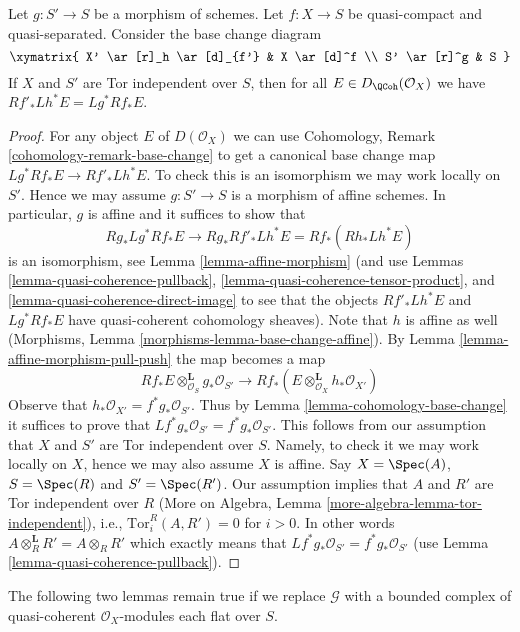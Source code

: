 \begin{lemma}
\label{lemma-compare-base-change}
Let $g : S' \to S$ be a morphism of schemes.
Let $f : X \to S$ be quasi-compact and quasi-separated.
Consider the base change diagram
$$
\xymatrix{
X' \ar[r]_h \ar[d]_{f'} &
X \ar[d]^f \\
S' \ar[r]^g &
S
}
$$
If $X$ and $S'$ are Tor independent over $S$, then for all
$E \in D_\QCoh(\mathcal{O}_X)$ we have
$Rf'_*Lh^*E = Lg^*Rf_*E$.
\end{lemma}

\begin{proof}
For any object $E$ of $D(\mathcal{O}_X)$ we can use
Cohomology, Remark \ref{cohomology-remark-base-change} to get a
canonical base change map $Lg^*Rf_*E \to Rf'_*Lh^*E$. To check this
is an isomorphism we may work locally on $S'$. Hence we may assume
$g : S' \to S$ is a morphism of affine schemes. In particular, $g$
is affine and it suffices to show that
$$
Rg_*Lg^*Rf_*E \to Rg_*Rf'_*Lh^*E = Rf_*(Rh_* Lh^* E)
$$
is an isomorphism, see Lemma \ref{lemma-affine-morphism}
(and use Lemmas \ref{lemma-quasi-coherence-pullback},
\ref{lemma-quasi-coherence-tensor-product}, and
\ref{lemma-quasi-coherence-direct-image}
to see that the objects $Rf'_*Lh^*E$ and $Lg^*Rf_*E$
have quasi-coherent cohomology sheaves). Note that $h$ is
affine as well (Morphisms, Lemma \ref{morphisms-lemma-base-change-affine}).
By Lemma \ref{lemma-affine-morphism-pull-push} the map becomes a map
$$
Rf_*E \otimes_{\mathcal{O}_S}^\mathbf{L} g_*\mathcal{O}_{S'}
\longrightarrow
Rf_*(E \otimes_{\mathcal{O}_X}^\mathbf{L} h_*\mathcal{O}_{X'})
$$
Observe that $h_*\mathcal{O}_{X'} = f^*g_*\mathcal{O}_{S'}$. Thus by
Lemma \ref{lemma-cohomology-base-change} it suffices to prove that
$Lf^*g_*\mathcal{O}_{S'} = f^*g_*\mathcal{O}_{S'}$. This follows from our
assumption that $X$ and $S'$ are Tor independent over $S$. Namely, to
check it we may work locally on $X$, hence we may also assume $X$ is affine.
Say $X = \Spec(A)$, $S = \Spec(R)$ and $S' = \Spec(R')$. Our assumption
implies that $A$ and $R'$ are Tor independent over $R$
(More on Algebra, Lemma \ref{more-algebra-lemma-tor-independent}), i.e.,
$\text{Tor}_i^R(A, R') = 0$ for $i > 0$. In other words
$A \otimes_R^\mathbf{L} R' = A \otimes_R R'$ which exactly means
that $Lf^*g_*\mathcal{O}_{S'} = f^*g_*\mathcal{O}_{S'}$
(use Lemma \ref{lemma-quasi-coherence-pullback}).
\end{proof}

\noindent
The following two lemmas remain true if we replace $\mathcal{G}$ with a
bounded complex of quasi-coherent $\mathcal{O}_X$-modules each flat over $S$.

